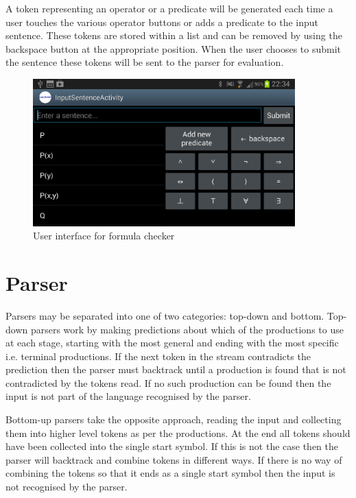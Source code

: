 A token representing an operator or a predicate will be generated each time a user touches the various operator buttons or adds a predicate to the input sentence. These tokens are stored within a list and can be removed by using the backspace button at the appropriate position. When the user chooses to submit the sentence these tokens will be sent to the parser for evaluation.

\begin{figure}[h]
\centering
\includegraphics[width=0.9\textwidth]{Images/formulachecker.png}
\caption{User interface for formula checker}
\label{fig:Compilation}
\end{figure}

\section{Parser}


Parsers may be separated into one of two categories: top-down and bottom. Top-down parsers work by making predictions about which of the productions to use at each stage, starting with the most general and ending with the most specific i.e. terminal productions. If the next token in the stream contradicts the prediction then the parser must backtrack until a production is found that is not contradicted by the tokens read. If no such production can be found then the input is not part of the language recognised by the parser. 

Bottom-up parsers take the opposite approach, reading the input and collecting them into higher level tokens as per the productions. At the end all tokens should have been collected into the single start symbol. If this is not the case then the parser will backtrack and combine tokens in different ways. If there is no way of combining the tokens so that it ends as a single start symbol then the input is not recognised by the parser.

